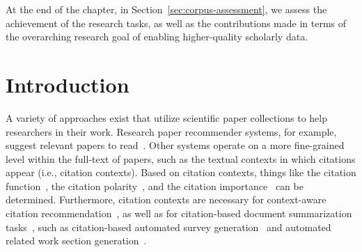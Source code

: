 At the end of the chapter, in Section~\ref{sec:corpus-assessment}, we assess the achievement of the research tasks, as well as the contributions made in terms of the overarching research goal of enabling higher-quality scholarly data.


\section{Introduction}
A variety of approaches exist that utilize scientific paper collections to help researchers in their work. 
Research paper recommender systems, for example, suggest relevant papers to read~\cite{Beel2016fixed}. Other systems operate on a more fine-grained level within the full-text of papers, such as the textual contexts in which citations appear (i.e., citation contexts). 
Based on citation contexts, things like the citation function~\cite{Teufel2006EMNLP,Teufel2006fixed,Moravcsik1975}, the citation polarity~\cite{GhoshD017,Abujbara2013}, and the citation importance~\cite{Valenzuela2015fixed,Chakraborty2016} can be determined. Furthermore, citation contexts are necessary for context-aware citation recommendation~\cite{He2010WWW,Ebensu2017}, as well as for citation-based document summarization tasks~\cite{Chandrasekaran2019}, such as citation-based automated survey generation~\cite{Mohammad2009} and automated related work section generation~\cite{Jinggiang2007}.

